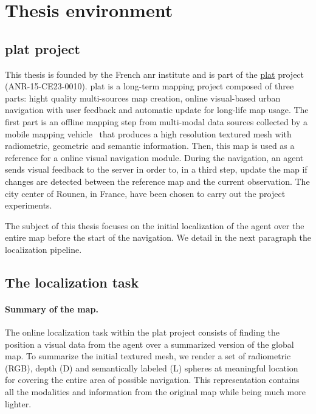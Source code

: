 \section{Thesis environment}
\label{sec:thesis_env}

\subsection{\acs*{plat} project}
\label{subsec:platinum}
This thesis is founded by the French \Ac{anr} institute and is part of the \href{http://platinum.projets.litislab.fr/}{\ac{plat}} project (ANR-15-CE23-0010). \Ac{plat} is a long-term mapping project composed of three parts: hight quality multi-sources map creation, online visual-based urban navigation with user feedback and automatic update for long-life map usage. The first part is an offline mapping step from multi-modal data sources collected by a mobile mapping vehicle~\citep{Paparoditis2012} that produces a high resolution textured mesh with radiometric, geometric and semantic information. Then, this map is used as a reference for a online visual navigation module. During the navigation, an agent sends visual feedback to the server in order to, in a third step, update the map if changes are detected between the reference map and the current observation. The city center of Rounen, in France, have been chosen to carry out the project experiments.

The subject of this thesis focuses on the initial localization of the agent over the entire map before the start of the navigation. We detail in the next paragraph the localization pipeline.

\subsection{The localization task}
\paragraph{Summary of the map.}
The online localization task within the \ac{plat} project consists of finding the position a visual data from the agent over a summarized version of the global map. To summarize the initial textured mesh, we render a set of radiometric (RGB), depth (D) and semantically labeled (L) spheres at meaningful location for covering the entire area of possible navigation. This representation contains all the modalities and information from the original map while being much more lighter.

